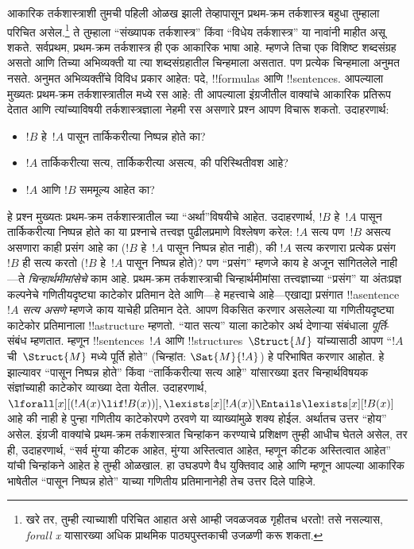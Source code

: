 \documentclass[../../../include/open-logic-section]{subfiles}
\begin{document}


आकारिक तर्कशास्त्राशी तुमची पहिली ओळख झाली तेव्हापासून प्रथम-क्रम
तर्कशास्त्र बहुधा तुम्हाला परिचित असेल.\footnote{खरे तर, तुम्ही त्याच्याशी
परिचित आहात असे आम्ही जवळजवळ गृहीतच धरतो!{} तसे नसल्यास,
\emph{forall x} \citep{Magnus2021} यासारख्या अधिक प्राथमिक
पाठ्यपुस्तकाची उजळणी करू शकता.} ते तुम्हाला ``संख्यापक तर्कशास्त्र''
किंवा ``विधेय तर्कशास्त्र'' या नावांनी माहीत असू शकते. सर्वप्रथम,
प्रथम-क्रम तर्कशास्त्र ही एक आकारिक भाषा आहे. म्हणजे तिचा एक विशिष्ट
शब्दसंग्रह असतो आणि तिच्या अभिव्यक्ती या त्या शब्दसंग्रहातील चिन्हमाला
असतात. पण प्रत्येक चिन्हमाला अनुमत नसते. अनुमत अभिव्यक्तींचे विविध
प्रकार आहेत: पदे, !!{formula}s आणि !!{sentence}s. आपल्याला मुख्यतः
प्रथम-क्रम तर्कशास्त्रातील मध्ये रस आहे: ती आपल्याला
इंग्रजीतील वाक्यांचे आकारिक प्रतिरूप देतात आणि त्यांच्याविषयी
तर्कशास्त्रज्ञाला नेहमी रस असणारे प्रश्न आपण विचारू शकतो. उदाहरणार्थ:
\begin{itemize}
    \item $!B$ हे~$!A$ पासून तार्किकरीत्या निष्पन्न होते का?
    \item $!A$ तार्किकरीत्या सत्य, तार्किकरीत्या असत्य, की
परिस्थितीवश आहे?
    \item $!A$ आणि $!B$ सममूल्य आहेत का?
\end{itemize}

हे प्रश्न मुख्यतः प्रथम-क्रम तर्कशास्त्रातील च्या
``अर्था''विषयीचे आहेत. उदाहरणार्थ, $!B$ हे~$!A$ पासून तार्किकरीत्या
निष्पन्न होते का या प्रश्नाचे तत्त्वज्ञ पुढीलप्रमाणे विश्लेषण करेल:
$!A$ सत्य पण~$!B$ असत्य असणारा काही प्रसंग आहे का ($!B$ हे~$!A$
पासून निष्पन्न होत नाही), की $!A$ सत्य करणारा प्रत्येक प्रसंग~$!B$ ही
सत्य करतो ($!B$ हे~$!A$ पासून निष्पन्न होते)? पण ``प्रसंग'' म्हणजे काय
हे अजून सांगितलेले नाही---ते \emph{चिन्हार्थमीमांसेचे} काम आहे.
प्रथम-क्रम तर्कशास्त्राची चिन्हार्थमीमांसा तत्त्वज्ञाच्या ``प्रसंग'' या
अंतःप्रज्ञ कल्पनेचे गणितीयदृष्ट्या काटेकोर प्रतिमान देते आणि---हे
महत्त्वाचे आहे---एखाद्या प्रसंगात !!a{sentence}~$!A$ \emph{सत्य असणे}
म्हणजे काय याचेही प्रतिमान देते. आपण विकसित करणार असलेल्या या
गणितीयदृष्ट्या काटेकोर प्रतिमानाला !!a{structure} म्हणतो. ``यात सत्य''
याला काटेकोर अर्थ देणाऱ्या संबंधाला \emph{पूर्ति}-संबंध म्हणतात. म्हणून
!!{sentence}s~$!A$ आणि !!{structure}s~$\Struct{M}$ यांच्यासाठी आपण
``$!A$ ची~$\Struct{M}$ मध्ये पूर्ति होते'' (चिन्हांत:
$\Sat{M}{!A}$) हे परिभाषित करणार आहोत. हे झाल्यावर ``पासून निष्पन्न
होते'' किंवा ``तार्किकरीत्या सत्य आहे'' यांसारख्या इतर चिन्हार्थविषयक
संज्ञांच्याही काटेकोर व्याख्या देता येतील. उदाहरणार्थ,
$\lforall[x][(!A(x) \lif !B(x))],
\lexists[x][!A(x)] \Entails \lexists[x][!B(x)]$ आहे की नाही हे पुन्हा
गणितीय काटेकोरपणे ठरवणे या व्याख्यांमुळे शक्य होईल. अर्थातच उत्तर
``होय'' असेल. इंग्रजी वाक्यांचे प्रथम-क्रम तर्कशास्त्रात चिन्हांकन
करण्याचे प्रशिक्षण तुम्ही आधीच घेतले असेल, तर ही, उदाहरणार्थ, ``सर्व
मुंग्या कीटक आहेत, मुंग्या अस्तित्वात आहेत, म्हणून कीटक अस्तित्वात
आहेत'' यांची चिन्हांकने आहेत हे तुम्ही ओळखाल. हा उघडपणे वैध युक्तिवाद
आहे आणि म्हणून आपल्या आकारिक भाषेतील ``पासून निष्पन्न होते'' याच्या
गणितीय प्रतिमानानेही तेच उत्तर दिले पाहिजे.
%
\end{document}
